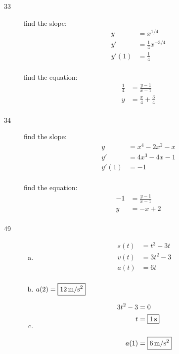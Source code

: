 \documentclass[letterpaper, landscape]{exam}
\begin{document}
\begin{description}
    \item[33] 
      find the slope: 
      \begin{align*}
        y     & = x^{1/4} \\
        y'    & = \frac{1}{4} x^{-3/4} \\
        y'(1) & = \frac{1}{4} \\
      \end{align*}

      find the equation:
      \begin{align*}
        \frac{1}{4} & = \frac{y - 1}{x - 1} \\
        y           & = \boxed{ \frac{x}{4} + \frac{3}{4} } \\
      \end{align*}

    \item[34] 
      find the slope: 
      \begin{align*}
        y     & = x^4 - 2x^2 - x \\
        y'    & = 4x^3 - 4x - 1 \\
        y'(1) & = -1 \\
      \end{align*}

      find the equation:
      \begin{align*}
        -1 & = \frac{y - 1}{x - 1} \\
        y  & = \boxed{ -x + 2 } \\
      \end{align*}
      
    \item[49]
      \begin{enumerate}[(a)]
        \item 
          \begin{align*}
            s(t) &= t^3 - 3t \\
            v(t) &= 3t^2 - 3 \\
            a(t) &= 6t \\
          \end{align*}

        \item $a(2) = \boxed{ \unit[12]{m/s^2} }$

        \item
          \begin{align*}
            3t^2 - 3 & = 0 \\
            t        & = \boxed{ \unit[1]{s} } \\
            \\
            a(1)     & = \boxed{ \unit[6]{m/s^2} } \\
          \end{align*}


\end{enumerate}
\end{description}
\end{document}
